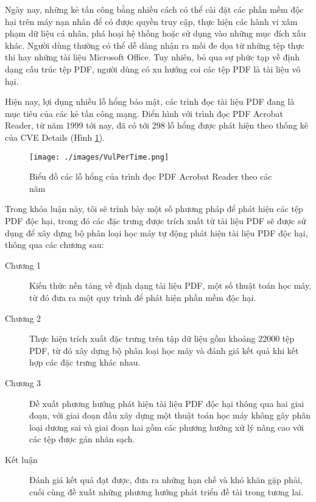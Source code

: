 \documentclass[./../main.tex]{subfiles}
\begin{document}
Ngày nay, những kẻ tấn công bằng nhiều cách có thể cài đặt các phần mềm độc hại trên máy nạn nhân để có được quyền truy cập, thực hiện các hành vi xâm phạm dữ liệu cá nhân, phá hoại hệ thống hoặc sử dụng vào những mục đích xấu khác. Người dùng thường có thể dễ dàng nhận ra mối đe dọa từ những tệp thực thi hay những tài liệu Microsoft Office. Tuy nhiên, bỏ qua sự phức tạp về định dạng cấu trúc tệp PDF, người dùng có xu hướng coi các tệp PDF là tài liệu vô hại.

Hiện nay, lợi dụng nhiều lỗ hổng bảo mật, các trình đọc tài liệu PDF đang là mục tiêu của các kẻ tấn công mạng. Điển hình với trình đọc PDF Acrobat Reader, từ năm 1999 tới nay, đã có tới 298 lỗ hổng được phát hiện theo thống kê của CVE Details (Hình \ref{fig:acrobatcve}).

\begin{figure}[ht!]
	\texttt{[image: ./images/VulPerTime.png]}
	\caption{Biểu đồ các lỗ hổng của trình đọc PDF Acrobat Reader theo các năm\protect\footnotemark}
	\label{fig:acrobatcve}
\end{figure}

Trong khóa luận này, tôi sẽ trình bày một số phương pháp để phát hiện các tệp PDF độc hại, trong đó các đặc trưng được trích xuất từ tài liệu PDF sẽ được sử dụng để xây dựng bộ phân loại học máy tự động phát hiện tài liệu PDF độc hại, thông qua các chương sau:
\begin{description}
	\item [Chương 1] Kiến thức nền tảng về định dạng tài liệu PDF, một số thuật toán học máy, từ đó đưa ra một quy trình để phát hiện phần mềm độc hại.
	\item [Chương 2] Thực hiện trích xuất đặc trưng trên tập dữ liệu gồm khoảng 22000 tệp PDF, từ đó xây dựng bộ phân loại học máy và đánh giá kết quả khi kết hợp các đặc trưng khác nhau.
	\item [Chương 3] Đề xuất phương hướng phát hiện tài liệu PDF độc hại thông qua hai giai đoạn, với giai đoạn đầu xây dựng một thuật toán học máy không gây phân loại dương sai và giai đoạn hai gồm các phương hướng xử lý nâng cao với các tệp được gán nhãn sạch.
	\item [Kết luận] Đánh giá kết quả đạt được, đưa ra những hạn chế và khó khăn gặp phải, cuối cùng đề xuất những phương hướng phát triển đề tài trong tương lai.
\end{description}
\end{document}
